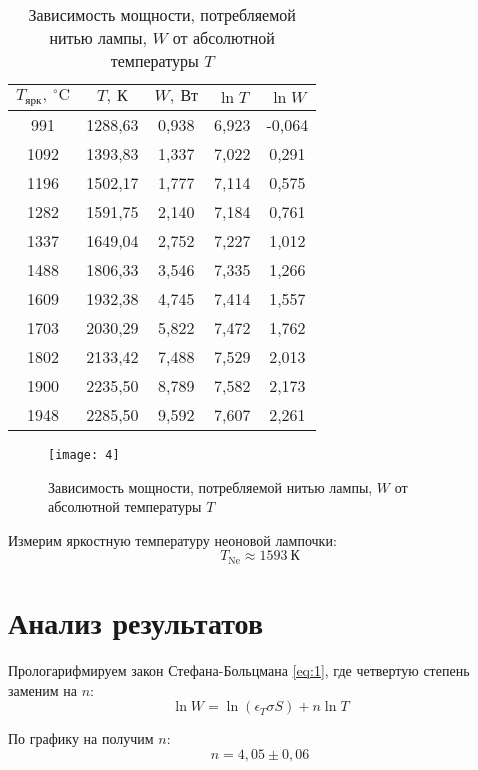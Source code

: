 \documentclass[a4paper, 12pt]{article}
\begin{document}
\renewcommand{\arraystretch}{1.5}
\begin{table}[H]
\centering
\begin{tabular}{|c|c|c|c|c|}
\hline
$T_\text{ярк},\: ^{\circ}\text{C}$    & $T,\: \text{К}$
& $W,\: \text{Вт}$     & $\ln T$   & $\ln W$    \\ \hline
991  & 1288,63 & 0,938 & 6,923 & -0,064 \\ \hline
1092 & 1393,83 & 1,337 & 7,022 & 0,291  \\ \hline
1196 & 1502,17 & 1,777 & 7,114 & 0,575  \\ \hline
1282 & 1591,75 & 2,140 & 7,184 & 0,761  \\ \hline
1337 & 1649,04 & 2,752 & 7,227 & 1,012  \\ \hline
1488 & 1806,33 & 3,546 & 7,335 & 1,266  \\ \hline
1609 & 1932,38 & 4,745 & 7,414 & 1,557  \\ \hline
1703 & 2030,29 & 5,822 & 7,472 & 1,762  \\ \hline
1802 & 2133,42 & 7,488 & 7,529 & 2,013  \\ \hline
1900 & 2235,50 & 8,789 & 7,582 & 2,173  \\ \hline
1948 & 2285,50 & 9,592 & 7,607 & 2,261  \\ \hline
\end{tabular}
\caption{Зависимость мощности, потребляемой нитью лампы, $W$ от
абсолютной температуры $T$}
\end{table}


\begin{figure}[H]
    \texttt{[image: 4]} 
    \caption{Зависимость мощности, потребляемой нитью лампы, $W$ от
абсолютной температуры $T$}
\label{fig:4}
\end{figure}




Измерим яркостную температуру неоновой лампочки:
\[
    T_\text{Ne} \approx 1593\: \text{К} 
\]






\section{Анализ результатов}
Прологарифмируем закон Стефана-Больцмана \eqref{eq:1}, где четвертую степень
заменим на $n$:
\[
    \ln W = \ln (\epsilon_T \sigma S) + n \ln T
\]

По графику на  получим $n$:
\[
    n = 4,05 \pm 0,06
\]
\end{document}
